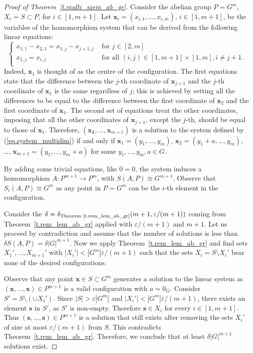 \documentclass[10pt]{article}
\begin{document}
\begin{proof}[Proof of Theorem~\ref{t.multi_szem_ab_gr}]
	Consider the abelian group $P=G^m$, $X_i=S\subset P$, for $i\in[1,m+1]$. Let $\mathbf{x}_i=(x_{i,1},\ldots,x_{i,m})$, $i\in[1,m+1]$, be the variables of the homomorphism system that can be derived from the following linear equations:
	\begin{equation}\label{eq.system_multidim}
		\left\{\begin{array}{cl}
		x_{1,1}-x_{2,1}= x_{1,j}-x_{j+1,j} & \text{ for } j\in[2,m] \\
		x_{1,j}=x_{i,j} & \text{ for all }(i,j)\in[1,m+1]\times[1,m], i\neq j+1.\\
	\end{array}\right. 
	\end{equation}
Indeed, $\mathbf{x}_1$ is thought of as the centre of the configuration. The first equations state that the difference between the $j$-th coordinate of $\mathbf{x}_{j+1}$ and the $j$-th coordinate of $\mathbf{x}_1$ is the same regardless of $j$; this is achieved by setting all the differences to be equal
to the difference between the first coordinate of $\mathbf{x}_2$ and the first coordinate of $\mathbf{x}_1$. The second set of equations treat the other coordinates, imposing that all the other coordinates of $\mathbf{x}_{j+1}$, except the $j$-th, should be equal to those of $\mathbf{x}_1$. Therefore, $(\mathbf{x_1},\ldots,\mathbf{x}_{m+1})$ is a solution to the system defined by 
(\ref{eq.system_multidim}) if and only if $\mathbf{x}_1=(y_1,\ldots,y_m)$, 
$\mathbf{x}_2=(y_1+a,\ldots,y_m)$, \ldots, $\mathbf{x}_{m+1}=(y_1,\ldots,y_m+a)$
for some $y_1,\ldots,y_m,a\in G$.

By adding some trivial equations, like $0=0$, the system induces a homomorphism $A:P^{m+1} \to P^{m}$, with $S(A,P)\cong G^{m+1}$. Observe that $S_i(A,P)\cong G^m$ as any point in $P=G^m$ can be the $i$-th element in the configuration. 

Consider the $\delta=\delta_{\text{Theorem~\ref{t.rem_lem_ab_gr}}}(m+1,\varepsilon/(m+1))$ coming from Theorem~\ref{t.rem_lem_ab_gr} applied with $\varepsilon/(m+1)$ and $m+1$.
Let us proceed by contradiction and assume that the number of solutions is less than $\delta S(A,P)=\delta |G|^{m+1}$. Now we apply Theorem~\ref{t.rem_lem_ab_gr} and find sets $X_1',\ldots,X_{m+1}'$ with $|X_i'|<|G^m|\varepsilon/(m+1)$ such that the sets $X_i=S\setminus X_i'$ bear none of the desired configurations.

Observe that any point $\mathbf{x}\in S\subset G^m$ generates a solution to the linear system as $(\mathbf{x},\ldots,\mathbf{x})\in P^{m+1}$ is a valid configuration with $a=0_{G}$. Consider $S'=S\setminus (\cup X_i')$. Since $|S|>\varepsilon|G^m|$ and $|X_i'|<|G^m|\varepsilon/(m+1)$, there exists an element $\mathbf{s}$ in $S'$, as $S'$ is non-empty. Therefore $\mathbf{s}\in X_i$ for every $i\in[1,m+1]$. Thus $(\mathbf{s},\ldots,\mathbf{s})\in P^{m+1}$ is a solution that still exists after removing the sets $X_i'$ of size at most $\varepsilon/(m+1)$ from $S$. This contradicts Theorem~\ref{t.rem_lem_ab_gr}. Therefore, we conclude that at least $\delta |G|^{m+1}$ solutions exist.
\end{proof}
\end{document}
